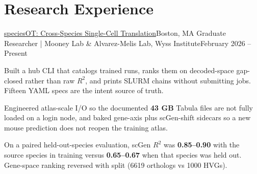 \resumeSubHeadingListEnd

\section{Research Experience}
\resumeSubHeadingListStart

  \resumeSubheading
    {\href{https://github.com/JunyiZhou-Conny/speciesOT}{speciesOT: Cross-Species Single-Cell Translation}}{Boston, MA}
    {Graduate Researcher | Mooney Lab \& Alvarez-Melis Lab, Wyss Institute}{February 2026 -- Present}
    \resumeItemListStart
      \item Built a hub CLI that catalogs trained runs, ranks them on decoded-space gap-closed rather than raw $R^2$, and prints SLURM chains without submitting jobs. Fifteen YAML specs are the intent source of truth.
      \item Engineered atlas-scale I/O so the documented \textbf{43 GB} Tabula files are not fully loaded on a login node, and baked gene-axis plus scGen-shift sidecars so a new mouse prediction does not reopen the training atlas.
      \item On a paired held-out-species evaluation, scGen $R^2$ was \textbf{0.85--0.90} with the source species in training versus \textbf{0.65--0.67} when that species was held out. Gene-space ranking reversed with split (6619 orthologs vs 1000 HVGs).
    \resumeItemListEnd

\resumeSubHeadingListEnd



